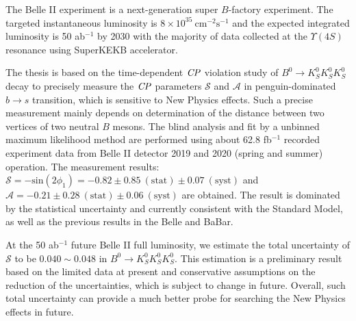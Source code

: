 % 
% 
%
The Belle II experiment is a next-generation super $B$-factory experiment. The targeted instantaneous luminosity is 
$8 \times 10^{35}~ \text{cm}^{-2}\text{s}^{-1}$ and the expected integrated luminosity is 50 ab$^{-1}$ by 2030 with the majority of data collected at the $\Upsilon(4S)$ resonance using SuperKEKB accelerator.

The thesis is based on the time-dependent $\it{CP}$ violation study of $B^0 \to K_S^0 K_S^0 K_S^0$ decay to precisely measure the $\it{CP}$ parameters $\mathcal{S}$ and $\mathcal{A}$ in penguin-dominated $b \to s$ transition, which is sensitive to New Physics effects. Such a precise measurement mainly depends on determination of the distance between two vertices of two neutral $B$ mesons. The blind analysis and fit by a unbinned maximum likelihood method are performed using about 62.8 fb$^{-1}$ recorded experiment data from Belle II detector 2019 and 2020 (spring and summer) operation. The measurement results: $\mathcal{S}= - \text{sin}(2\phi_1) = -0.82 \pm 0.85~(\text{stat}) \pm 0.07 ~(\text{syst})$ and $\mathcal{A}= -0.21 \pm 0.28 ~ (\text{stat}) \pm 0.06 ~ (\text{syst})$ are obtained. The result is dominated by the statistical uncertainty and currently consistent with the Standard Model, as well as the previous results in the Belle and BaBar. 

At the 50 ab$^{-1}$ future Belle II full luminosity, we estimate the total uncertainty of $\mathcal{S}$ to be $0.040\sim 0.048$ in $B^0 \to K_S^0  K_S^0  K_S^0$. This estimation is a preliminary result based on the limited data at present and conservative assumptions on the reduction of the uncertainties, which is subject to change in future. Overall, such total uncertainty can provide a much better probe for searching the New Physics effects in future.




 

